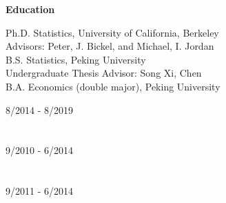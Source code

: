 \documentclass{article}
\begin{document}
\vspace{5mm}
\begin{large}
\noindent \textbf{Education}
\end{large}
\vspace{5mm}

\begin{minipage}{0.65\linewidth}
\noindent Ph.D. Statistics, University of California, Berkeley\\
Advisors: Peter, J. Bickel, and Michael, I. Jordan\\

\noindent B.S. Statistics, Peking University\\
Undergraduate Thesis Advisor: Song Xi, Chen\\

\noindent B.A. Economics (double major), Peking University

\end{minipage}\hfill
\begin{minipage}{0.34\linewidth}
\flushright
\vspace{-1mm}
8/2014 - 8/2019 \\
~\\
~\\
9/2010 - 6/2014\\
~\\
~\\
9/2011 - 6/2014\\
\end{minipage}






\end{document}
